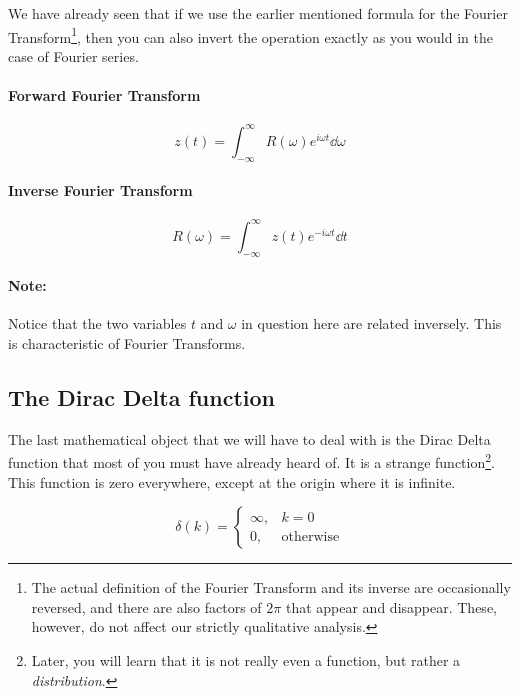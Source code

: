 We have already seen that if we use the earlier mentioned formula for the Fourier Transform\footnote{The actual definition of the Fourier Transform and its inverse are occasionally reversed, and there are also factors of $2\pi$ that appear and disappear. These, however, do not affect our strictly qualitative analysis.}, then you can also invert the operation exactly as you would in the case of Fourier series. 

\begin{tcolorbox}

\paragraph{Forward Fourier Transform}

\begin{equation*}
z(t) = \int^\infty_{-\infty} R(\omega) e^{i \omega t} \dd \omega
\end{equation*}

\paragraph{Inverse Fourier Transform}

\begin{equation*}
R(\omega) = \int^\infty_{-\infty} z(t) e^{-i \omega t} \dd t
\end{equation*}

\paragraph{Note: } Notice that the two variables $t$ and $\omega$ in question here are related inversely. This is characteristic of Fourier Transforms.

\end{tcolorbox}

\subsection{The Dirac Delta function}

The last mathematical object that we will have to deal with is the Dirac Delta function that most of you must have already heard of. It is a strange function\footnote{Later, you will learn that it is not really even a function, but rather a \textit{distribution}.}. This function is zero everywhere, except at the origin where it is infinite.

\begin{equation*}
\delta (k) = \begin{cases}
              \infty, & k = 0\\
               0,              & \text{otherwise}
             \end{cases}
\end{equation*}

